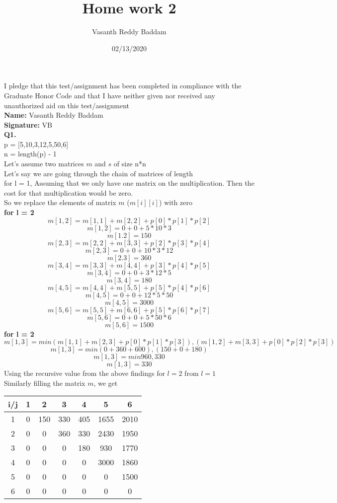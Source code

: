 \documentclass[11pt]{article}
\title{Home work 2}
\author{Vasanth Reddy Baddam}
\date{02/13/2020}
\begin{document}
\maketitle
I pledge that this test/assignment has been completed in compliance with the Graduate Honor Code and
that I have neither given nor received any unauthorized aid on this test/assignment\\
\textbf{Name: } Vasanth Reddy Baddam\\
\textbf{Signature: } VB\\
\hline
\vspace{5mm}
\textbf{Q1.}\\
p = [5,10,3,12,5,50,6]\\
n = length(p) - 1\\
Let's assume two matrices $m$ and $s$ of size n*n\\
Let's say we are going through the chain of matrices of length\\
for l = 1, Assuming that we only have one matrix on the multiplication. Then the cost for that multiplication would be zero.\\
So we replace the elements of matrix $m$ ($m[i][i]$) with zero\\
\textbf{for l = 2}\\
$$m[1,2] = m[1,1] + m[2,2] + p[0]*p[1]*p[2]$$
$$m[1,2] = 0 + 0 + 5*10*3$$
$$m[1.2] = 150$$
$$m[2,3] = m[2,2] + m[3,3] + p[2]*p[3]*p[4]$$
$$m[2,3] = 0 + 0 + 10*3*12$$
$$m[2.3] = 360$$
$$m[3,4] = m[3,3] + m[4,4] + p[3]*p[4]*p[5]$$
$$m[3,4] = 0 + 0 + 3*12*5$$
$$m[3,4] = 180$$
$$m[4,5] = m[4,4] + m[5,5]+ p[5]*p[4]*p[6]$$
$$m[4,5] = 0 + 0 + 12*5*50$$
$$m[4,5] = 3000$$
$$m[5,6] = m[5,5]+ m[6,6] + p[5]*p[6]*p[7]$$
$$m[5,6] = 0 + 0 + 5*50*6$$
$$m[5,6] = 1500$$
\textbf{for l = 2}
$$m[1,3] = min{(m[1,1] + m[2,3] + p[0]*p[1]*p[3]), (m[1,2] + m[3,3] + p[0]*p[2]*p[3])}$$
$$m[1,3] = min{(0 + 360 + 600), (150 + 0 + 180)}$$
$$m[1,3] = min{960, 330}$$
$$m[1,3] = 330$$
Using the recursive value from the above findings for $l = 2$ from $l = 1$\\
Similarly filling the matrix $m$, we get \\
\begin{center}
 \begin{tabular}{||c c c c c c c||} 
 \hline
 i/j & 1 & 2 & 3 & 4 & 5 & 6 \\ [0.5ex] 
 \hline\hline
 1 & 0 & 150 & 330 & 405 & 1655 & 2010 \\ 
 \hline 
 2 & 0 & 0   & 360 & 330 & 2430 & 1950 \\
 \hline
 3 & 0 & 0   & 0   & 180 & 930  & 1770 \\
 \hline
 4 & 0 & 0   & 0   & 0   & 3000 & 1860 \\
 \hline
 5 & 0 & 0   & 0   & 0   & 0    & 1500 \\
 \hline 
 6 & 0 & 0   & 0   & 0   & 0    & 0\\[1ex] 
 \hline
\end{tabular}
\end{center}
\end{document}
